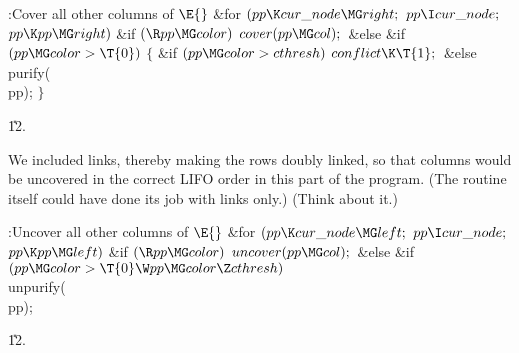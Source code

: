 \B{}:Cover all other columns of \X${}\E{}$\6
\&{for} ${}(\\{pp}\K\\{cur\_node}\MG\\{right};{}$ ${}\\{pp}\I\\{cur\_node};{}$
${}\\{pp}\K\\{pp}\MG\\{right}){}$\1\6
\&{if} ${}(\R\\{pp}\MG\\{color}){}$\1\5
${}\\{cover}(\\{pp}\MG\\{col});{}$\2\6
\&{else} \&{if} ${}(\\{pp}\MG\\{color}>\T{0}){}$\5
${}\{{}$\1\6
\&{if} ${}(\\{pp}\MG\\{color}>\\{cthresh}){}$\1\5
${}\\{conflict}\K\T{1};{}$\2\6
\&{else}\1\5
\\{purify}(\\{pp});\2\6
\4${}\}{}$\2\2\par
\U12.\fi

We included  links, thereby making the rows doubly linked,
so
that columns would be uncovered in the correct LIFO order in this
part of the program. (The  routine itself could have done its
job with  links only.) (Think about it.)

\Y\B\4:Uncover all other columns of \X${}\E{}$\6
\&{for} ${}(\\{pp}\K\\{cur\_node}\MG\\{left};{}$ ${}\\{pp}\I\\{cur\_node};{}$
${}\\{pp}\K\\{pp}\MG\\{left}){}$\1\6
\&{if} ${}(\R\\{pp}\MG\\{color}){}$\1\5
${}\\{uncover}(\\{pp}\MG\\{col});{}$\2\6
\&{else} \&{if} ${}(\\{pp}\MG\\{color}>\T{0}\W\\{pp}\MG\\{color}\Z%
\\{cthresh}){}$\1\5
\\{unpurify}(\\{pp});\2\2\par
\U12.\fi

